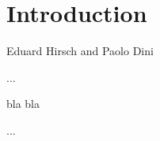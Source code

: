 \chapter{Introduction}
\label{ch:Introduction}

\vspace{-1cm}
\begin{center}
Eduard Hirsch and Paolo Dini
\end{center}


...

bla bla

...














\newpage











